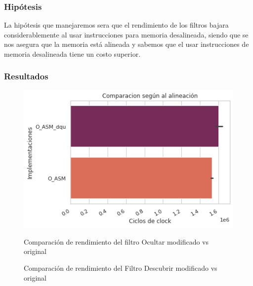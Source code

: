\documentclass[a4paper]{article}
\begin{document}
\subsubsection{Hipótesis}
La hipótesis que manejaremos sera que el rendimiento de los filtros bajara considerablemente al usar instrucciones para memoria desalineada, siendo que se nos asegura que la memoria está alineada y sabemos que el usar instrucciones de memoria desalineada tiene un costo superior.
\subsubsection{Resultados}
\begin{figure}[h!]
    \begin{center}
 	\includegraphics[scale=0.5]{graphs2/filtro-comparativo-O-alineacion-asm.png}
 	\caption{Comparación de rendimiento del filtro Ocultar modificado vs original}
 	\label{fig:exp-ocultar-dqu-vs-dqa}
   \end{center}
    
    \qquad
    \caption{Comparación de rendimiento del Filtro Descubrir modificado vs original}%
    \label{fig:exp-descubrir-dqu-vs-dqa}%
    
\end{figure}
\end{document}
